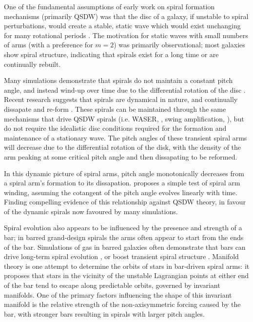 One of the fundamental assumptions of early work on spiral formation mechanisms (primarily QSDW) was that the disc of a galaxy, if unstable to spiral perturbations, would create a stable, static wave which would exist unchanging for many rotational periods \citep{1964ApJ...140..646L}. The motivation for static waves with small numbers of arms (with a preference for $m=2$) was primarily observational; most galaxies show spiral structure, indicating that spirals exist for a long time or are continually rebuilt.

Many simulations demonstrate that spirals do not maintain a constant pitch angle, and instead wind-up over time due to the differential rotation of the disc \citep{2013ApJ...763...46B}. Recent research suggests that spirals are dynamical in nature, and continually dissapate and re-form \citep{2014PASA...31...35D}. These spirals can be maintained through the same mechanisms that drive QSDW spirals (i.e. WASER, \citealt{1976ApJ...205..363M}, swing amplification, \citealt{1965MNRAS.130..125G}), but do not require the idealistic disc conditions required for the formation and maintenance of a stationary wave. The pitch angles of these transient spiral arms will decrease due to the differential rotation of the disk, with the density of the arm peaking at some critical pitch angle and then dissapating to be reformed.

In this dynamic picture of spiral arms, pitch angle monotonically decreases from a spiral arm's formation to its dissapation. \citet{2019arXiv190910291P} proposes a simple test of spiral arm winding, assuming the cotangent of the pitch angle evolves linearly with time. Finding compelling evidence of this relationship against QSDW theory, in favour of the dynamic spirals now favoured by many simulations.

Spiral evolution also appears to be influenced by the presence and strength of a bar; in barred grand-design spirals the arms often appear to start from the ends of the bar. Simulations of gas in barred galaxies often demonstrate that bars can drive long-term spiral evolution \citep{2008A&A...489..115R}, or boost transient spiral structure \citep{2012MNRAS.426..167G}. Manifold theory is one attempt to determine the orbits of stars in bar-driven spiral arms: it proposes that stars in the vicinity of the unstable Lagrangian points at either end of the bar tend to escape along predictable orbits, governed by invariant manifolds. One of the primary factors influencing the shape of this invariant manifold is the relative strength of the non-axisymmetric forcing caused by the bar, with stronger bars resulting in spirals with larger pitch angles.

